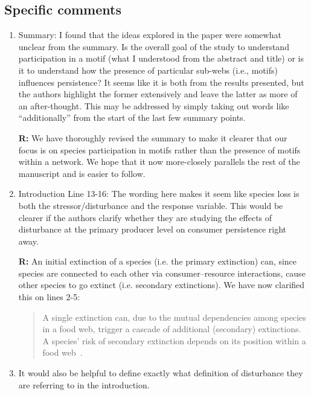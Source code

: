 \documentclass[12pt]{article}
\begin{document}
    \subsection*{Specific comments}

        \begin{enumerate}

            \item Summary: I found that the ideas explored in the paper were somewhat unclear from the summary. Is the overall goal of the study to understand participation in a motif (what I understood from the abstract and title) or is it to understand how the presence of particular sub-webs (i.e., motifs) influences persistence? It seems like it is both from the results presented, but the authors highlight the former extensively and leave the latter as more of an after-thought. This may be addressed by simply taking out words like ``additionally'' from the start of the last few summary points.

                \textbf{R:} We have thoroughly revised the summary to make it clearer that our focus is on species participation in motifs rather than the presence of motifs within a network. We hope that it now more-closely parallels the rest of the manuscript and is easier to follow.

    
            \item Introduction Line 13-16: The wording here makes it seem like species loss is both the stressor/disturbance and the response variable. This would be clearer if the authors clarify whether they are studying the effects of disturbance at the primary producer level on consumer persistence right away. 

                \textbf{R:} An initial extinction of a species (i.e. the primary extinction) can, since species are connected to each other via  consumer--resource interactions, cause other species to go extinct (i.e. secondary extinctions). We have now clarified this on lines 2-5: 

                \begin{quotation}
                A single extinction can, due to the mutual dependencies among species in a food web,  trigger a cascade of additional (secondary) extinctions. 
                A species' risk of secondary extinction depends on its position within a food web~\citep{Santos2021,dunne2009cascading, Eklof2006}.
                \end{quotation}
            
            \item It would also be helpful to define exactly what definition of disturbance they are referring to in the introduction.
            

\end{enumerate}
\end{document}

